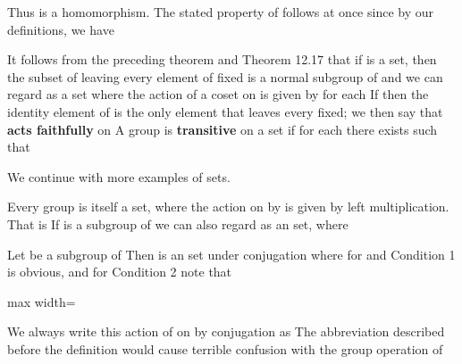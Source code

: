 \documentclass[11pt,oneside]{article}
\begin{document}
\begin{BookBody}
\noindent Thus \BookInline{\phi } is a homomorphism. The stated property of \BookInline{\phi } follows at once since by our definitions, we have \BookEnd{\blacklozenge}

It follows from the preceding theorem and Theorem 12.17 that if  is a set, then the subset of  leaving every element of  fixed is a normal subgroup  of  and we can regard  as a set where the action of a coset  on  is given by  for each  If  then the identity element of  is the only element that leaves every  fixed; we then say that  \textbf{acts faithfully} on  A group  is\textbf{ transitive} on a set  if for each  there exists  such that 

We continue with more examples of sets.

 Every group  is itself a set, where the action on  by  is given by left multiplication. That is If  is a subgroup of  we can also regard  as an set, where \BookEnd{\blacktriangle}

 Let  be a subgroup of  Then  is an set under conjugation where  for  and  Condition 1 is obvious, and for Condition 2 note that

\begin{center}\begin{adjustbox}{max width=\linewidth}\end{adjustbox}\end{center}

\noindent We always write this action of  on  by conjugation as  The abbreviation  described before the definition would cause terrible confusion with the group operation of \BookEnd{\blacktriangle}


\end{BookBody}
\end{document}
